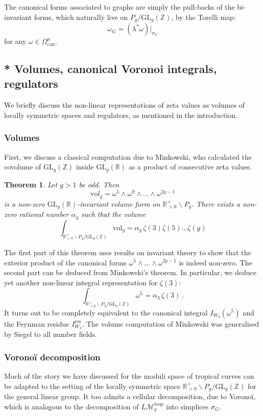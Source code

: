 \documentclass[12pt]{amsart}
\newcommand{\RR}{{\mathbb R}}
\newcommand{\ZZ}{{\mathbb Z}}
\theoremstyle{plain}
\newtheorem{thm}{Theorem}
\newcommand{\LM}{L\mathcal{M}}
\newcommand{\GL}{\mathrm{GL}}
\newcommand{\trop}{\mathrm{trop}}
\newcommand{\0}{\color{blue}{\mathsf{0}}}
\begin{document}
 
 
 
 
 The  canonical forms associated to graphs   are simply the pull-backs of the bi-invariant forms, which naturally live on $P_g/\GL_g(\ZZ)$, by the Torelli map:
 \[ \omega_G =  (\lambda^* \omega)\big|_{\sigma_G}\]
 for any $\omega \in \Omega^n_{\mathrm{can}}.$
 
 \subsection{* Volumes, canonical Voronoi integrals, regulators}
 We briefly discuss the non-linear representations of zeta values  as volumes of locally symmetric spaces and regulators, as mentioned in the  introduction.
 
\subsubsection{Volumes} First, we discuss a classical computation  due to Minkowski, who  calculated the covolume of $\mathrm{GL}_g(\ZZ)$ inside $\mathrm{GL}_g(\RR)$ as a product of consecutive zeta values.  \begin{thm} Let $g>1$ be odd. Then 
 \[ \mathrm{vo}l_g =  \omega^5 \wedge \omega^9 \wedge \ldots \wedge \omega^{2g-1}\]
 is a non-zero $\GL_g(\RR)$-invariant   volume form on $\RR^{\times}_{>0} \backslash P_g$. There exists a non-zero rational number $\alpha_g$ such that the volume 
 \[ \int_{\RR^{\times}_{>0} \backslash P_g/\mathrm{GL}_g(\ZZ)}  \mathrm{vol}_g =  \alpha_g \, \zeta(3) \zeta(5) \ldots \zeta(g)\]
 \end{thm} 
 
 The first part of this theorem uses results on invariant theory to show that the exterior product of the canonical forms $\omega^5 \wedge \ldots \wedge \omega^{2g-1}$ is indeed non-zero. The second part can be deduced  from Minkowski's theorem.   In particular, we deduce yet another non-linear integral representation for $\zeta(3)$:
 \[ \int_{\RR^{\times}_{>0} \backslash P_3/\mathrm{GL}_3(\ZZ)}  \omega^5 =  \alpha_3 \, \zeta(3) \ .\]
 It turns out to be completely equivalent to the canonical integral $I_{W_3}(\omega^5)$ and the Feynman residue $I^{\mathrm{res}}_{W_3}$. 
  The volume computation of Minkowski was generalised by Siegel to all number fields.  
 
 
\subsubsection{Vorono\"i decomposition} Much of the story we have discussed for the moduli space of tropical curves can be adapted to the setting of the locally symmetric space  $\RR^{\times}_{>0} \backslash P_g/\GL_g(\ZZ)$ for the general linear group. It too admits a cellular decomposition, due to Vorono\"i, which is analogous to the decomposition of  $\LM_g^{\trop}$ into simplices $\sigma_G$. 
 
\end{document}
